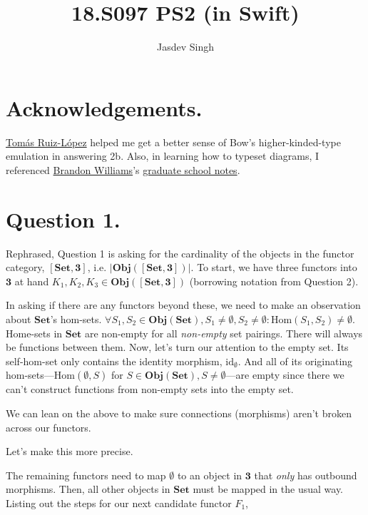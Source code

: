 \documentclass{article}
\title{18.S097 PS2 (in Swift)}
\author{Jasdev Singh}
\begin{document}
\maketitle

\section*{Acknowledgements.}

\href{https://twitter.com/tomasruizlopez}{Tomás Ruiz-López} helped me get a better sense of Bow’s higher-kinded-type emulation in answering 2b. Also, in learning how to typeset diagrams, I referenced \href{https://twitter.com/mbrandonw}{Brandon Williams}’s \href{https://github.com/mbrandonw/my-math-notes}{graduate school notes}.

\section*{Question 1.}

Rephrased, Question 1 is asking for the cardinality of the objects in the functor category, $[\textbf{Set}, \textbf{3}]$, i.e. $|\textbf{Obj}([\textbf{Set}, \textbf{3}])|$. To start, we have three functors into $\textbf{3}$ at hand $K_1, K_2, K_3 \in \textbf{Obj}([\textbf{Set}, \textbf{3}])$ (borrowing notation from Question 2).

In asking if there are any functors beyond these, we need to make an observation about $\textbf{Set}$’s hom-sets. $\forall S_1, S_2 \in \textbf{Obj}(\textbf{Set}), S_1 \neq \emptyset, S_2 \neq \emptyset: \textrm{Hom}(S_1, S_2) \neq \emptyset$. Home-sets in $\textbf{Set}$ are non-empty for all \textit{non-empty} set pairings. There will always be functions between them.
Now, let's turn our attention to the empty set. Its self-hom-set only contains the identity morphism, $\textrm{id}_{\emptyset}$. And all of its originating hom-sets—$\textrm{Hom}(\emptyset, S)$ for $S \in \textbf{Obj}(\textbf{Set}), S \neq \emptyset$—are empty since there we can’t construct functions from non-empty sets into the empty set.

We can lean on the above to make sure connections (morphisms) aren’t broken across our functors.

Let’s make this more precise.

The remaining functors need to map $\emptyset$ to an object in $\textbf{3}$ that \textit{only} has outbound morphisms. Then, all other objects in $\textbf{Set}$ must be mapped in the usual way. Listing out the steps for our next candidate functor $F_1$,
\end{document}
